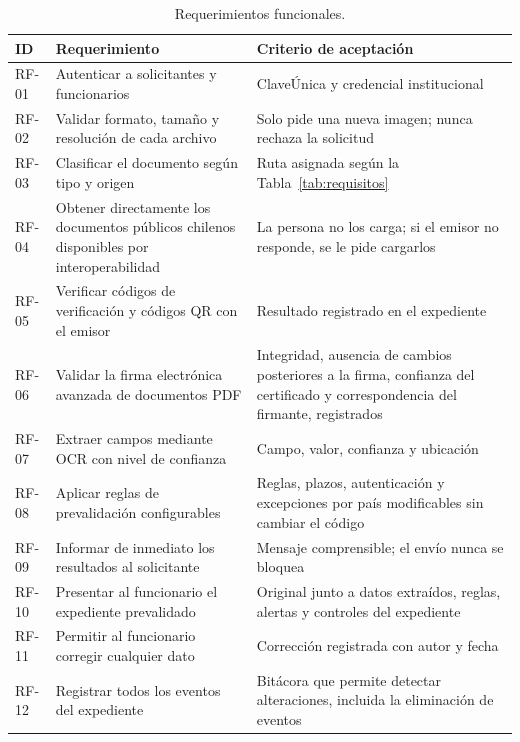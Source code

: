 \documentclass[11pt,a4paper]{article}
\begin{document}
\begin{table}[!htbp]
\centering
\caption{Requerimientos funcionales.}
\label{tab:rf}
\small
\begin{tabularx}{\textwidth}{>{\raggedright\arraybackslash}p{1.3cm} L >{\raggedright\arraybackslash}p{4.8cm}}
\toprule
\textbf{ID} & \textbf{Requerimiento} & \textbf{Criterio de aceptación} \\
\midrule
RF-01 & Autenticar a solicitantes y funcionarios & ClaveÚnica y credencial institucional \\
RF-02 & Validar formato, tamaño y resolución de cada archivo & Solo pide una nueva imagen; nunca rechaza la solicitud \\
RF-03 & Clasificar el documento según tipo y origen & Ruta asignada según la Tabla~\ref{tab:requisitos} \\
RF-04 & Obtener directamente los documentos públicos chilenos disponibles por interoperabilidad & La persona no los carga; si el emisor no responde, se le pide cargarlos \\
RF-05 & Verificar códigos de verificación y códigos QR con el emisor & Resultado registrado en el expediente \\
RF-06 & Validar la firma electrónica avanzada de documentos PDF & Integridad, ausencia de cambios posteriores a la firma, confianza del certificado y correspondencia del firmante, registrados \\
RF-07 & Extraer campos mediante OCR con nivel de confianza & Campo, valor, confianza y ubicación \\
RF-08 & Aplicar reglas de prevalidación configurables & Reglas, plazos, autenticación y excepciones por país modificables sin cambiar el código \\
RF-09 & Informar de inmediato los resultados al solicitante & Mensaje comprensible; el envío nunca se bloquea \\
RF-10 & Presentar al funcionario el expediente prevalidado & Original junto a datos extraídos, reglas, alertas y controles del expediente \\
RF-11 & Permitir al funcionario corregir cualquier dato & Corrección registrada con autor y fecha \\
RF-12 & Registrar todos los eventos del expediente & Bitácora que permite detectar alteraciones, incluida la eliminación de eventos \\
\bottomrule
\end{tabularx}
\end{table}
\end{document}
